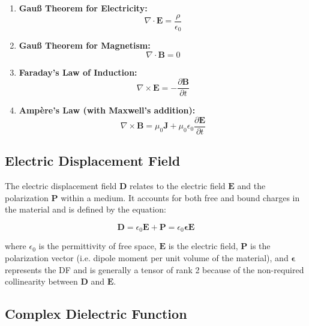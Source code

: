 \begin{enumerate}
\item \textbf{Gau{\ss} Theorem for Electricity:}
    \begin{equation}
    \nabla \cdot \mathbf{E} = \frac{\rho}{\epsilon_0}
    \end{equation}

    \item \textbf{Gau{\ss} Theorem for Magnetism:}
    \begin{equation}
    \nabla \cdot \mathbf{B} = 0
    \end{equation}

    \item \textbf{Faraday's Law of Induction:}
    \begin{equation}
    \nabla \times \mathbf{E} = -\frac{\partial \mathbf{B}}{\partial t}
    \end{equation}

    \item \textbf{Ampère's Law (with Maxwell's addition):}
    \begin{equation}
    \nabla \times \mathbf{B} = \mu_0 \mathbf{J} + \mu_0 \epsilon_0 \frac{\partial \mathbf{E}}{\partial t}
    \end{equation}
\end{enumerate}

\subsection{Electric Displacement Field}


The electric displacement field \( \mathbf{D} \) relates to the electric field \( \mathbf{E} \) and the polarization \( \mathbf{P} \) within a medium. It accounts for both free and bound charges in the material and is defined by the equation:

\[
	\mathbf{D} = \epsilon_0 \mathbf{E} + \mathbf{P} = \epsilon_0 \boldsymbol{\epsilon} \mathbf{E}
\]

where \( \epsilon_0 \) is the permittivity of free space, \( \mathbf{E} \) is the electric field, \( \mathbf{P} \) is the polarization vector (i.e. dipole moment per unit volume of the material), and \( \boldsymbol{\epsilon} \) represents the \ac{DF} %
and is generally a tensor of rank 2 because of the non-required collinearity between \( \mathbf{D} \) and \( \mathbf{E} \). %



\subsection{Complex Dielectric Function}


